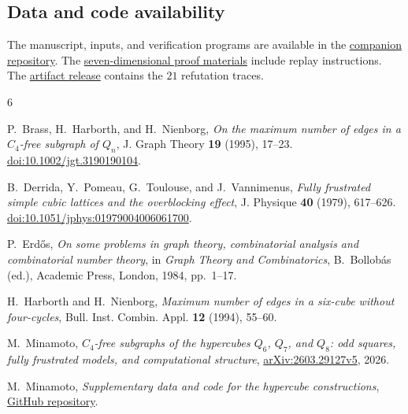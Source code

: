 \documentclass[11pt,reqno]{amsart}
\numberwithin{equation}{section}
\begin{document}
\subsection*{Data and code availability}
The manuscript, inputs, and verification programs are available in the
\href{https://github.com/zhelizhou/hypercube-c4}{companion repository}.
The \href{https://github.com/zhelizhou/hypercube-c4/tree/main/q7}
{seven-dimensional proof materials} include replay instructions. The
\href{https://github.com/zhelizhou/hypercube-c4/releases/tag/artifacts-v0.1}
{artifact release} contains the \(21\) refutation traces.

\begin{thebibliography}{6}

P.~Brass, H.~Harborth, and H.~Nienborg,
\emph{On the maximum number of edges in a \(C_4\)-free subgraph of \(Q_n\)},
J. Graph Theory \textbf{19} (1995), 17--23.
\href{https://doi.org/10.1002/jgt.3190190104}{doi:10.1002/jgt.3190190104}.

B.~Derrida, Y.~Pomeau, G.~Toulouse, and J.~Vannimenus,
\emph{Fully frustrated simple cubic lattices and the overblocking effect},
J. Physique \textbf{40} (1979), 617--626.
\href{https://doi.org/10.1051/jphys:01979004006061700}
{doi:10.1051/jphys:01979004006061700}.

P.~Erd\H{o}s,
\emph{On some problems in graph theory, combinatorial analysis and combinatorial number theory},
in \emph{Graph Theory and Combinatorics}, B.~Bollob\'as (ed.),
Academic Press, London, 1984, pp.~1--17.

H.~Harborth and H.~Nienborg,
\emph{Maximum number of edges in a six-cube without four-cycles},
Bull. Inst. Combin. Appl. \textbf{12} (1994), 55--60.

M.~Minamoto,
\emph{\(C_4\)-free subgraphs of the hypercubes \(Q_6\), \(Q_7\), and \(Q_8\):
odd squares, fully frustrated models, and computational structure},
\href{https://arxiv.org/abs/2603.29127v5}{arXiv:2603.29127v5}, 2026.

M.~Minamoto,
\emph{Supplementary data and code for the hypercube constructions},
\href{https://github.com/minamominamoto/c4free-hypercube}
{GitHub repository}.

\end{thebibliography}
\end{document}

